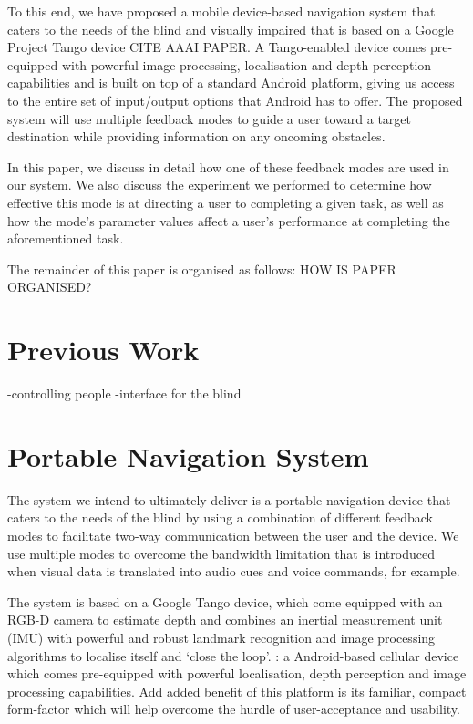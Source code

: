 \documentclass[format=sigconf, review=true, screen=true, anonymous=true]{acmart}
\begin{document}
To this end, we have proposed a mobile device-based navigation system that caters to the needs of the blind and visually impaired that is based on a Google Project Tango device {CITE AAAI PAPER}. A Tango-enabled device comes pre-equipped with powerful image-processing, localisation and depth-perception capabilities and is built on top of a standard Android platform, giving us access to the entire set of input/output options that Android has to offer. The proposed system will use multiple feedback modes to guide a user toward a target destination while providing information on any oncoming obstacles.

In this paper, we discuss in detail how one of these feedback modes are used in our system. We also discuss the experiment we performed to determine how effective this mode is at directing a user to completing a given task, as well as how the mode's parameter values affect a user's performance at completing the aforementioned task. 

The remainder of this paper is organised as follows: HOW IS PAPER ORGANISED?

\section{Previous Work}

-controlling people
-interface for the blind

\section{Portable Navigation System}

The system we intend to ultimately deliver is a portable navigation device that caters to the needs of the blind by using a combination of different feedback modes to facilitate two-way communication between the user and the device. We use multiple modes to overcome the bandwidth limitation that is introduced when visual data is translated into audio cues and voice commands, for example. 

The system is based on a Google Tango device, which come equipped with an RGB-D camera to estimate depth and combines an inertial measurement unit (IMU) with powerful and robust landmark recognition and image processing algorithms to localise itself and `close the loop'. : a Android-based cellular device which comes pre-equipped with powerful localisation, depth perception and image processing capabilities. Add added benefit of this platform is its familiar, compact form-factor which will help overcome the hurdle of user-acceptance and usability. 
\end{document}

